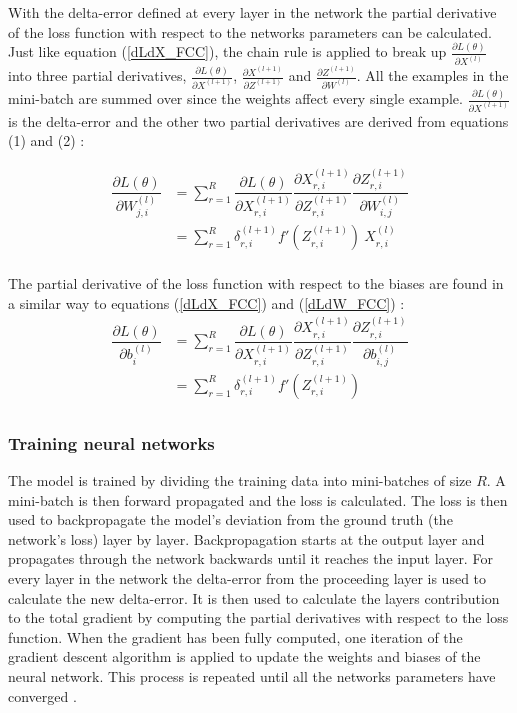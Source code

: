 \documentclass[a4paper, twoside]{article}
\newcommand*{\pd}[2]{\ensuremath{\dfrac{\partial #1}{\partial #2}}}
\newcommand*{\inpd}[2]{\ensuremath{\frac{\partial #1}{\partial #2}}}
\begin{document}
With the delta-error defined at every layer in the network the partial derivative of the loss function with respect to the networks parameters can be calculated. Just like equation (\ref{dLdX_FCC}), the chain rule is applied to break up $\inpd{L(\theta)}{X^{(l)}}$ into three partial derivatives, $\inpd{L(\theta)}{X^{(l+1)}}$, $\inpd{X^{(l+1)}}{Z^{(l+1)}}$ and $\inpd{Z^{(l+1)}}{W^{(l)}}$. All the examples in the mini-batch are summed over since the weights affect every single example. $\inpd{L(\theta)}{X^{(l+1)}}$ is the delta-error and the other two partial derivatives are derived from equations (1) and (2) \cite{cs231n} \cite{wikiStanford}:

\begin{equation}\label{dLdW_FCC}
\begin{split}
\pd{L(\theta)}{W^{(l)}_{j,i}} 
	& = \sum^{R}_{r=1} \pd{L(\theta)}{X^{(l+1)}_{r,i}} \pd{X^{(l+1)}_{r,i}}{Z^{(l+1)}_{r,i}} \pd{Z^{(l+1)}_{r,i}}{W^{(l)}_{i,j}} \\
	& = \sum^{R}_{r=1} \delta^{(l+1)}_{r,i} f'(Z^{(l+1)}_{r,i}) \ X^{(l)}_{r,i}\\
\end{split}
\end{equation}

The partial derivative of the loss function with respect to the biases are found in a similar way to equations (\ref{dLdX_FCC}) and (\ref{dLdW_FCC}) \cite{cs231n} \cite{wikiStanford}:
\begin{equation}\label{dLdb_FCC}
\begin{split}
\pd{L(\theta)}{b^{(l)}_i} 
	& = \sum^{R}_{r=1} \pd{L(\theta)}{X^{(l+1)}_{r,i}} \pd{X^{(l+1)}_{r,i}}{Z^{(l+1)}_{r,i}} \pd{Z^{(l+1)}_{r,i}}{b^{(l)}_{i,j}} \\
	& = \sum^{R}_{r=1} \delta^{(l+1)}_{r,i} f'(Z^{(l+1)}_{r,i}) \\
\end{split}
\end{equation}

\subsubsection{Training neural networks}
The model is trained by dividing the training data into mini-batches of size $R$. A mini-batch is then forward propagated and the loss is calculated. The loss is then used to backpropagate the model's deviation from the ground truth (the network's loss) layer by layer. Backpropagation starts at the output layer and propagates through the network backwards until it reaches the input layer. For every layer in the network the delta-error from the proceeding layer is used to calculate the new delta-error. It is then used to calculate the layers contribution to the total gradient by computing the partial derivatives with respect to the loss function. When the gradient has been fully computed, one iteration of the gradient descent algorithm is applied to update the weights and biases of the neural network. This process is repeated until all the networks parameters have converged \cite{cs231n}.
\end{document}
